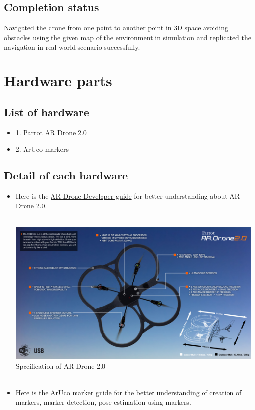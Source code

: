 \documentclass[a4paper,12pt,oneside]{book}
\begin{document}
\section{Completion status}
Navigated the drone from one point to another point in 3D space avoiding obstacles using the given map of the environment in simulation and replicated the navigation in real world scenario successfully.


\chapter{Hardware parts}

 \section{ List of hardware} 
  \begin{itemize}
  \item 1. Parrot AR Drone 2.0 
  \item  2. ArUco markers
  \end{itemize} 
 
  \section{Detail of each hardware} 
  \begin{itemize}
  \item Here is the 
  \href{http://www.robotappstore.com/Files/KB/ARDrone/ARDrone_SDK_1_7_Developer_Guide.pdf}{AR Drone Developer guide} 
 for better understanding about AR Drone 2.0.\\\
 \begin{center}
 \includegraphics[scale=0.3]{drone_specs}\\
 Specification of AR Drone 2.0\\\
 \end{center}
 
  \item Here is the \href{http://docs.opencv.org/3.1.0/d5/dae/tutorial_aruco_detection.html}{ArUco marker guide} for the better understanding of creation of markers, marker detection, pose estimation using markers.
  
    \end{itemize}   
\end{document}
